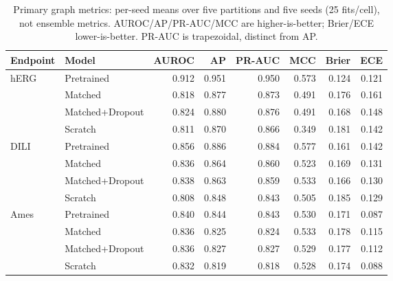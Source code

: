 \begin{table}[t]
\centering
\caption{Primary graph metrics: per-seed means over five partitions and five seeds (25 fits/cell), not ensemble metrics. AUROC/AP/PR-AUC/MCC are higher-is-better; Brier/ECE lower-is-better. PR-AUC is trapezoidal, distinct from AP.}\label{tab:metrics}
\small
\begin{tabular}{llrrrrrr}
\toprule
Endpoint & Model & AUROC & AP & PR-AUC & MCC & Brier & ECE\\
\midrule
hERG & Pretrained & 0.912 & 0.951 & 0.950 & 0.573 & 0.124 & 0.121\\
 & Matched & 0.818 & 0.877 & 0.873 & 0.491 & 0.176 & 0.161\\
 & Matched+Dropout & 0.824 & 0.880 & 0.876 & 0.491 & 0.168 & 0.148\\
 & Scratch & 0.811 & 0.870 & 0.866 & 0.349 & 0.181 & 0.142\\
\midrule
DILI & Pretrained & 0.856 & 0.886 & 0.884 & 0.577 & 0.161 & 0.142\\
 & Matched & 0.836 & 0.864 & 0.860 & 0.523 & 0.169 & 0.131\\
 & Matched+Dropout & 0.838 & 0.863 & 0.859 & 0.533 & 0.166 & 0.130\\
 & Scratch & 0.808 & 0.848 & 0.843 & 0.505 & 0.185 & 0.129\\
\midrule
Ames & Pretrained & 0.840 & 0.844 & 0.843 & 0.530 & 0.171 & 0.087\\
 & Matched & 0.836 & 0.825 & 0.824 & 0.533 & 0.178 & 0.115\\
 & Matched+Dropout & 0.836 & 0.827 & 0.827 & 0.529 & 0.177 & 0.112\\
 & Scratch & 0.832 & 0.819 & 0.818 & 0.528 & 0.174 & 0.088\\
\bottomrule
\end{tabular}
\end{table}
